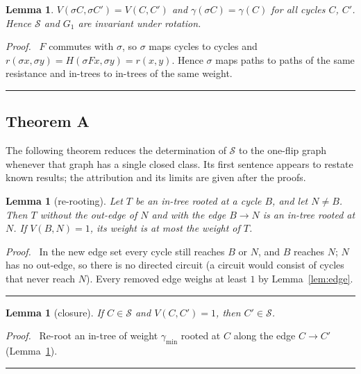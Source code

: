 \documentclass[10pt,a4paper]{article}
\newtheorem{lemma}[theorem]{Lemma}
\newcommand{\qedmark}{\rule{1.1ex}{1.1ex}}
\newenvironment{proof}[1][Proof]{\par\smallskip\noindent\textit{#1.}\ }{\hfill\qedmark\par\smallskip}
\newcommand{\gmin}{\gamma_{\min}}
\newcommand{\Sel}{\mathcal{S}}                %
\newcommand{\Gone}{G_1}                       %
\begin{document}
\begin{lemma}\label{lem:sym}
$V(\sigma C,\sigma C')=V(C,C')$ and $\gamma(\sigma C)=\gamma(C)$ for all cycles $C$, $C'$. Hence $\Sel$ and $\Gone$ are
invariant under rotation.
\end{lemma}
\begin{proof}
$F$ commutes with $\sigma$, so $\sigma$ maps cycles to cycles and $r(\sigma x,\sigma y)=H(\sigma Fx,\sigma y)=r(x,y)$.
Hence $\sigma$ maps paths to paths of the same resistance and in-trees to in-trees of the same weight.
\end{proof}

\subsection{Theorem A}
The following theorem reduces the determination of $\Sel$ to the one-flip graph whenever that graph has a single closed
class. Its first sentence appears to restate known results; the attribution and its limits are given after the
proofs.

\begin{lemma}[re-rooting]\label{lem:reroot}
Let $T$ be an in-tree rooted at a cycle $B$, and let $N\ne B$. Then $T$ without the out-edge of $N$ and with the edge
$B\to N$ is an in-tree rooted at $N$. If $V(B,N)=1$, its weight is at most the weight of $T$.
\end{lemma}
\begin{proof}
In the new edge set every cycle still reaches $B$ or $N$, and $B$ reaches $N$; $N$ has no out-edge, so there is no
directed circuit (a circuit would consist of cycles that never reach $N$). Every removed edge weighs at least $1$ by Lemma~\ref{lem:edge}.
\end{proof}

\begin{lemma}[closure]\label{lem:closure}
If $C\in\Sel$ and $V(C,C')=1$, then $C'\in\Sel$.
\end{lemma}
\begin{proof}
Re-root an in-tree of weight $\gmin$ rooted at $C$ along the edge $C\to C'$ (Lemma~\ref{lem:reroot}).
\end{proof}
\end{document}
